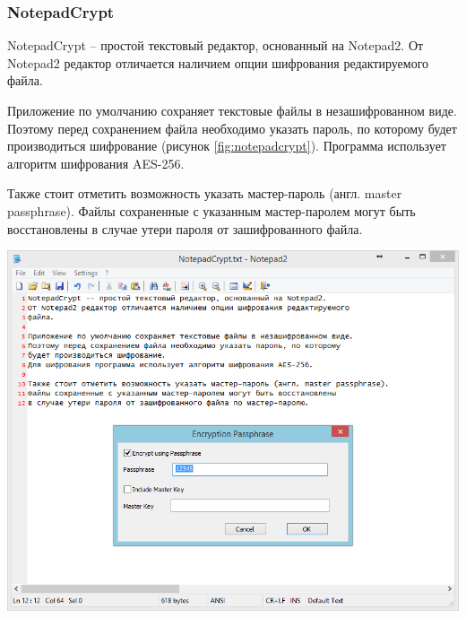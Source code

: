 \newpage
\subsubsection{NotepadCrypt}


NotepadCrypt -- простой текстовый редактор, основанный на Notepad2.
От Notepad2 редактор отличается наличием опции шифрования редактируемого
файла.

Приложение по умолчанию сохраняет текстовые файлы в незашифрованном виде.
Поэтому перед сохранением файла необходимо указать пароль, по которому
будет производиться шифрование (рисунок \ref{fig:notepadcrypt}).
Программа использует алгоритм шифрования AES-256.

Также стоит отметить возможность указать мастер-пароль (англ. master passphrase).
Файлы сохраненные с указанным мастер-паролем могут быть восстановлены
в случае утери пароля от зашифрованного файла.

\noindent
\begin{minipage}{\textwidth}
  \vspace{3.5mm}
  \centering
  \includegraphics[scale=0.6]{./pics/notepadcrypt-main.png}
  \label{fig:notepadcrypt}
  \vspace{3.5mm}
\end{minipage}

\newpage
